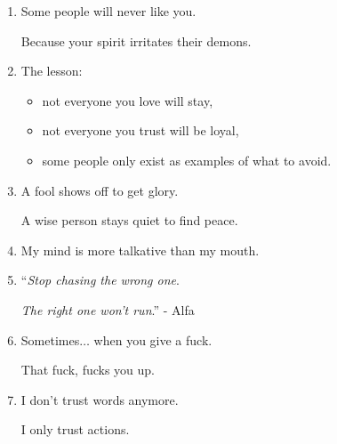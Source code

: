 \documentclass{article}
\numberwithin{equation}{section}
\begin{document}
\begin{enumerate}
    Someone became a CEO at 25 and died at 50.
    
    While another became a CEO at 50 and lived to 90 years.
    
    Someone is still single, while someone else got married.
    
    Everyone in this world works based on their time zone.
    
    People around you might seem to be ahead of you and some might seem to be behind you.
    
    But everyone is running their own race, in their own time.
    
    Do not envy them and do not mock them.
    
    They are in their time zone, and you are in yours.
    
    Life is about waiting for the right moment to act.
    
    So relax.
    
    You're not early.
    
    You're not late.
    
    You are very much on time.
    \item Some people will never like you.
    
    Because your spirit irritates their demons.
    \item The lesson:
    \begin{itemize}
        \item not everyone you love will stay,
        \item not everyone you trust will be loyal,
        \item some people only exist as examples of what to avoid.
    \end{itemize}
    \item A fool shows off to get glory.
    
    A wise person stays quiet to find peace.
    \item My mind is more talkative than my mouth.
    \item ``\textit{Stop chasing the wrong one}.
    
    \textit{The right one won't run}.'' - Alfa
    \item Sometimes$\ldots$ when you give a fuck.
    
    That fuck, fucks you up.
    \item I don't trust words anymore.
    
    I only trust actions.
    

\end{enumerate}
\end{document}
